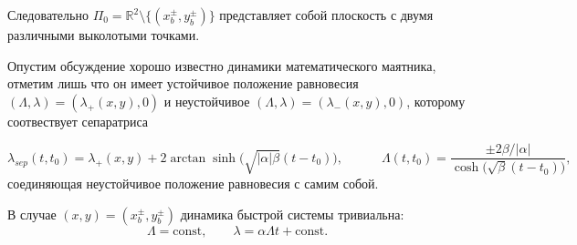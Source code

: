 Следовательно $\Pi_0 = \mathbb{R}^2 \setminus \{(x_b^\pm, y_b^\pm)\}$ представляет собой плоскость с двумя различными выколотыми точками.

Опустим обсуждение хорошо известно динамики математического маятника, отметим лишь что он имеет устойчивое положение равновесия $(\Lambda, \lambda) = (\lambda_+(x,y),0)$ и неустойчивое $(\Lambda, \lambda) = (\lambda_-(x,y),0)$, которому соотвествует сепаратриса

\begin{equation}
\lambda_{sep}(t, t_0) = \lambda_{+}(x,y) + 2 \arctan \sinh \big( \sqrt{|\alpha| \beta} (t-t_0) \big),
\quad \quad \quad
\Lambda(t, t_0) = \frac{\pm 2 \beta/|\alpha|}{\cosh \big( \sqrt{\beta} (t-t_0) \big)},
\end{equation}
соединяющая неустойчивое положение равновесия с самим собой.

В случае $(x,y) = (x_b^\pm, y_b^\pm)$ динамика быстрой системы тривиальна:
$$\Lambda = \text{const}, \qquad \lambda = \alpha \Lambda t + \text{const}.$$



